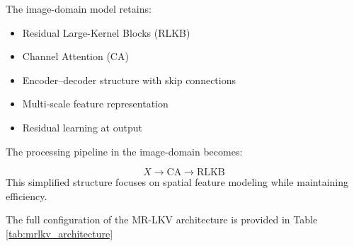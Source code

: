 The image-domain model retains:
\begin{itemize}
    \item  Residual Large-Kernel Blocks (RLKB)
    \item  Channel Attention (CA)
    \item Encoder--decoder structure with skip connections
    \item Multi-scale feature representation
    \item Residual learning at output
\end{itemize}




The processing pipeline in the image-domain becomes: 

\begin{equation}
X \rightarrow  \mathrm{CA} \rightarrow \mathrm{RLKB}
\end{equation}
This simplified structure focuses on spatial feature modeling while maintaining efficiency.

The full configuration of the MR-LKV architecture is provided in Table \ref{tab:mrlkv_architecture} 

